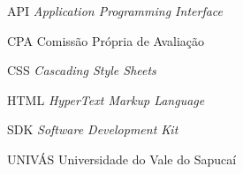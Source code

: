 
\begin{SingleSpace}

	\begin{siglas}
		\item[API]		\textit{Application Programming Interface}
		\item[CPA] 		Comissão Própria de Avaliação
		\item[CSS] 		\textit{Cascading Style Sheets}
		\item[HTML] 	\textit{HyperText Markup Language}
		\item[SDK]  	\textit{Software Development Kit}
		\item[UNIVÁS]   Universidade do Vale do Sapucaí
	\end{siglas}

\end{SingleSpace}
